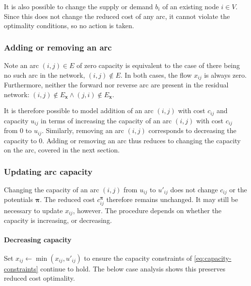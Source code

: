 It is also possible to change the supply or demand $b_i$ of an existing node $i \in V$\footnotemark. Since this does not change the reduced cost of any arc, it cannot violate the optimality conditions, so no action is taken.

\subsubsection{Adding or removing an arc}

Note an arc $(i,j) \in E$ of zero capacity is equivalent to the case of there being no such arc in the network, $(i,j) \not \in E$. In both cases, the flow $x_{ij}$ is always zero. Furthermore, neither the forward nor reverse arc are present in the residual network: $(i,j) \not \in E_\mathbf{x} \land (j,i) \not \in E_\mathbf{x}$.

It is therefore possible to model addition of an arc $(i,j)$ with cost $c_{ij}$ and capacity $u_{ij}$ in terms of increasing the capacity of an arc $(i,j)$ with cost $c_{ij}$ from $0$ to $u_{ij}$. Similarly, removing an arc $(i,j)$ corresponds to decreasing the capacity to $0$. Adding or removing an arc thus reduces to changing the capacity on the arc, covered in the next section.

\subsubsection{Updating arc capacity}

Changing the capacity of an arc $(i,j)$ from $u_{ij}$ to $u'_{ij}$ does not change $c_{ij}$ or the potentials $\boldsymbol{\pi}$. The reduced cost $c_{ij}^{\boldsymbol{\pi}}$ therefore remains unchanged. It may still be necessary to update $x_{ij}$, however. The procedure depends on whether the capacity is increasing, or decreasing.

\paragraph{Decreasing capacity}
Set $x_{ij} \gets \min\left(x_{ij},u'_{ij}\right)$ to ensure the capacity constraints of \cref{eq:capacity-constraints} continue to hold\footnotemark. The below case analysis shows this preserves reduced cost optimality.

